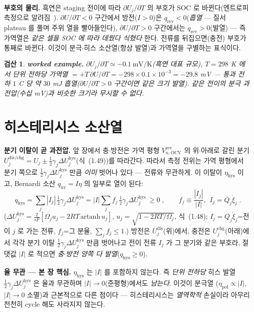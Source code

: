 \documentclass[11pt,a4paper]{article}
\newtheorem*{verifybox}{검산}
\newcommand{\OCV}{\mathrm{OCV}}
\newcommand{\dis}{\mathrm{dis}}
\newcommand{\chg}{\mathrm{chg}}
\newcommand{\hys}{\mathrm{hys}}
\newcommand{\pol}{\mathrm{pol}}
\newcommand{\rev}{\mathrm{rev}}
\newcommand{\irr}{\mathrm{irr}}
\begin{document}
\textbf{부호의 물리.} 흑연은 staging 전이에 따라 $\partial U_j/\partial T$ 의 부호가 SOC 로 바뀐다(엔트로피 측정으로
알려짐~\cite{reynier2004}). $\partial U/\partial T<0$ 구간에서 방전($I>0$)은 $q_\rev<0$(\emph{흡열} — 질서 plateau 를 풀며 주위 열을 빨아들인다),
$\partial U/\partial T>0$ 구간에서는 $q_\rev>0$(발열) — 즉 가역열은 \emph{같은 셀을 SOC 에 따라 데웠다 식혔다} 한다.
전류를 뒤집으면(충전) 부호가 통째로 바뀐다. 이것이 분극$\cdot$히스 소산열(항상 발열)과 가역열을 구별하는
표식이다.
\begin{verifybox}
\textbf{worked example.} $\partial U_j/\partial T\simeq-0.1\ \mathrm{mV/K}$(흑연 대표 규모), $T=298$ K 에서 단위
전하당 가역열 $=+T\,\partial U/\partial T=-298\times0.1\times10^{-3}=-29.8$ mV — 통과 전하 $1$ C 당 약 $30$ mJ
\emph{흡열}($\partial U/\partial T>0$ 구간이면 같은 크기 발열). 같은 전이의 분극 과전압(수십 mV)과 비슷한 \emph{크기}라
무시할 수 없다.
\end{verifybox}

\section{히스테리시스 소산열}\label{sec:h_hys}
\textbf{분기 이탈이 곧 과전압.} 앞 장에서 충$\cdot$방전은 가역 평형 $V_{n,\OCV}^\rev$ 의 위$\cdot$아래로 갈린
분기 $U_j^{\dis/\chg}=U_j\pm\tfrac12\gamma_j\Delta U_j^\hys$(식~(1.49))를 따라간다. 따라서 측정 전위는 가역 평형에서
분기 쪽으로 $\tfrac12\gamma_j\Delta U_j^\hys$ 만큼 \emph{이미} 벗어나 있다 — 전류와 무관하게. 이 이탈이
$\eta_\hys$ 이고, Bernardi 소산 $q_\irr=I\eta$ 의 일부로 열이 된다:
\begin{equation}
\boxed{\;q_\hys=\sum_j|I_j|\,\tfrac12\gamma_j\Delta U_j^\hys=|I|\sum_jf_j\,\tfrac12\gamma_j\Delta U_j^\hys\ \ge0\;,\qquad
f_j\equiv\frac{|I_j|}{|I|},\ \ I_j=Q_j\dot\xi_j\;.}
\label{eq:h_qhys}
\end{equation}
($\Delta U_j^\hys=\tfrac{2}{sF}[\Omega_j u_j-2RT\,\mathrm{artanh}\,u_j]$, $u_j=\sqrt{1-2RT/\Omega_j}$, 식~(1.48);
$I_j=Q_j\dot\xi_j$=전이 $j$ 로 가는 전류, $f_j$=그 분율, $\sum_jf_j\le1$.) 방전은 $U_j^\dis$(위)에서,
충전은 $U_j^\chg$(아래)에서 각각 분기 이탈 $\tfrac12\gamma_j\Delta U_j^\hys$ 만큼 벗어나고 전이 전류 $I_j$ 가 그
분기와 같은 부호라, 절댓값 $|I|$ 로 적으면 \emph{충$\cdot$방전 양쪽 다 발열}($q_\hys\ge0$).

\textbf{율 무관 — 본 장 핵심.} $\eta_\hys$ 는 $|I|$ 를 포함하지 않는다. 즉 \emph{단위 전하당} 히스 발열
$\tfrac12\gamma_j\Delta U_j^\hys$ 은 율과 무관하며 $|I|\to0$(준평형)에서도 \emph{남는다}. 이것이 분극열
($\eta_\pol\propto|I|$, $|I|\to0$ 소멸)과 근본적으로 다른 점이다 — 히스테리시스는 \emph{열역학적} 손실이라 아무리
천천히 cycle 해도 사라지지 않는다.
\end{document}
